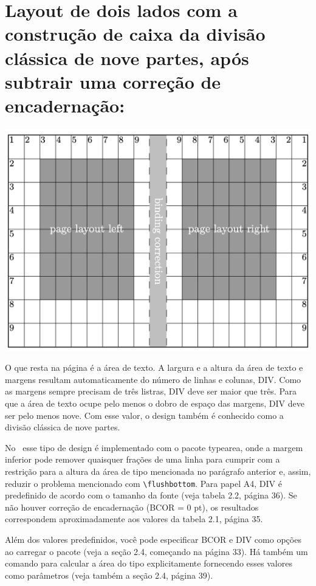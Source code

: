 \section*{Layout de dois lados com a construção de caixa da divisão clássica de nove partes, após subtrair uma correção de encadernação:
}
\includegraphics[scale=0.8]{imagem02.png}

O que resta na página é a área de texto. A largura e a altura da área de texto e margens resultam automaticamente do número de linhas e colunas, DIV. Como as margens sempre precisam de três listras, DIV deve ser maior que três. Para que a área de texto ocupe pelo menos o dobro de espaço das margens, DIV deve ser pelo menos nove. Com esse valor, o design também é conhecido como a divisão clássica de nove partes.

No \KOMAScript\ esse tipo de design é implementado com o pacote typearea, onde a margem inferior pode remover quaisquer frações de uma linha para cumprir com a restrição para a altura da área de tipo mencionada no parágrafo anterior e, assim, reduzir o problema mencionado com \verb|\flushbottom|. Para papel A4, DIV é predefinido de acordo com o tamanho da fonte (veja tabela 2.2, página 36). Se não houver correção de encadernação (BCOR = 0 pt), os resultados correspondem aproximadamente aos valores da tabela 2.1, página 35.

Além dos valores predefinidos, você pode especificar BCOR e DIV como opções ao carregar o pacote (veja a seção 2.4, começando na página 33). Há também um comando para calcular a área do tipo explicitamente fornecendo esses valores como parâmetros (veja também a seção 2.4, página 39).

